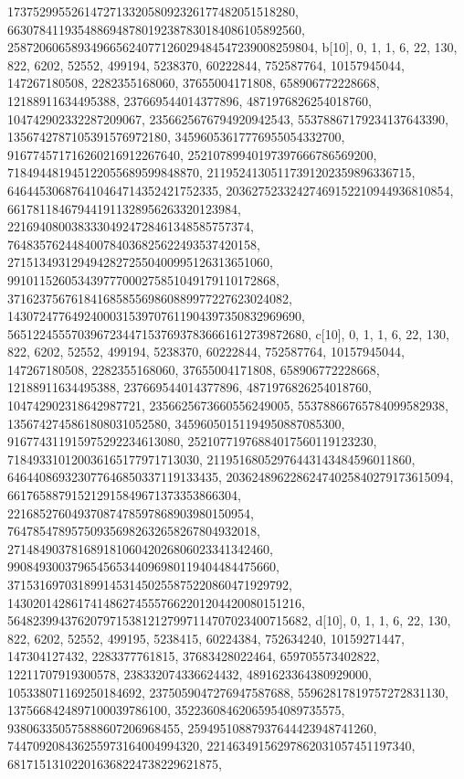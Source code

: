 {{{   173752995526147271332058092326177482051518280, 
   6630784119354886948780192387830184086105892560, 
   258720606589349665624077126029484547239008259804}}, 
 {b[10], {0, 1, 1, 6, 22, 130, 822, 6202, 52552, 499194, 5238370, 60222844, 
   752587764, 10157945044, 147267180508, 2282355168060, 37655004171808, 
   658906772228668, 12188911634495388, 237669544014377896, 
   4871976826254018760, 104742902332287209067, 2356625676794920942543, 
   55378867179234137643390, 1356742787105391576972180, 
   34596053617776955054332700, 916774571716260216912267640, 
   25210789940197397666786569200, 718494481945122055689599848870, 
   21195241305117391202359896336715, 646445306876410464714352421752335, 
   20362752332427469152210944936810854, 661781184679441911328956263320123984, 
   22169408003833304924728461348585757374, 
   764835762448400784036825622493537420158, 
   27151349312949428272550400995126313651060, 
   991011526053439777000275851049179110172868, 
   37162375676184168585569860889977227623024082, 
   1430724776492400031539707611904397350832969690, 
   56512245557039672344715376937836661612739872680}}, 
 {c[10], {0, 1, 1, 6, 22, 130, 822, 6202, 52552, 499194, 5238370, 60222844, 
   752587764, 10157945044, 147267180508, 2282355168060, 37655004171808, 
   658906772228668, 12188911634495388, 237669544014377896, 
   4871976826254018760, 104742902318642987721, 2356625673660556249005, 
   55378866765784099582938, 1356742745861808031052580, 
   34596050151194950887085300, 916774311915975292234613080, 
   25210771976884017560119123230, 718493310120036165177971713030, 
   21195168052976443143484596011860, 646440869323077646850337119133435, 
   20362489622862474025840279173615094, 661765887915212915849671373353866304, 
   22168527604937087478597868903980150954, 
   764785478957509356982632658267804932018, 
   27148490378168918106042026806023341342460, 
   990849300379654565344096980119404484475660, 
   37153169703189914531450255875220860471929792, 
   1430201428617414862745557662201204420080151216, 
   56482399437620797153812127997114707023400715682}}, 
 {d[10], {0, 1, 1, 6, 22, 130, 822, 6202, 52552, 499195, 5238415, 60224384, 
   752634240, 10159271447, 147304127432, 2283377761815, 37683428022464, 
   659705573402822, 12211707919300578, 238332074336624432, 
   4891623364380929000, 105338071169250184692, 2375059047276947587688, 
   55962817819757272831130, 1375668424897100039786100, 
   35223608462065954089735575, 938063350575888607206968455, 
   25949510887937644423948741260, 744709208436255973164004994320, 
   22146349156297862031057451197340, 681715131022016368224738229621875, 
}}}
